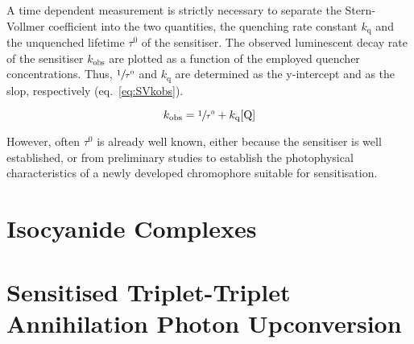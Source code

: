 	A time dependent measurement is strictly necessary to separate the Stern-Vollmer coefficient into the two quantities, the quenching rate constant $k_\mathrm{q}$ and the unquenched lifetime $\tau^0$ of the sensitiser. The observed luminescent decay rate of the sensitiser $k_\mathrm{obs}$ are plotted as a function of the employed quencher concentrations. Thus, $\sfrac{1}{\tau^0}$ and $k_\mathrm{q}$ are determined as the y-intercept and as the slop, respectively (eq.~\ref{eq:SVkobs}).

	\begin{equation}
	\label{eq:SVkobs}
		k_\mathrm{obs} = \sfrac{1}{\tau^0} + k_\mathrm{q}\ce{[Q]}
	\end{equation}
	
	However, often $\tau^0$ is already well known, either because the sensitiser is well established, or from preliminary studies to establish the photophysical characteristics of a newly developed chromophore suitable for sensitisation. 

\chapter{Isocyanide Complexes}

\chapter{Sensitised Triplet-Triplet Annihilation Photon Upconversion}
\label{ch:sTTA-UC}